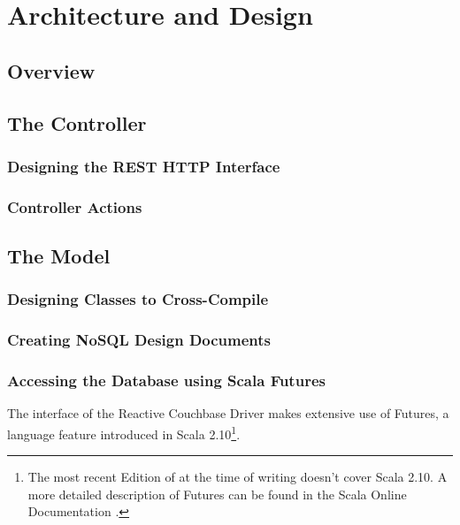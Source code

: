 \section{Architecture and Design}

\subsection{Overview}


\subsection{The Controller}

\subsubsection{Designing the REST HTTP Interface}


\subsubsection{Controller Actions}


\subsection{The Model}

\subsubsection{Designing Classes to Cross-Compile}


\subsubsection{Creating NoSQL Design Documents}

\subsubsection{Accessing the Database using Scala Futures}

The interface of the Reactive Couchbase Driver makes extensive use of Futures, a language feature introduced in Scala 2.10\footnote{The most recent Edition of \cite{scala-book} at the time of writing doesn't cover Scala 2.10. A more detailed description of Futures can be found in the Scala Online Documentation \cite{scala-futures}.}.


